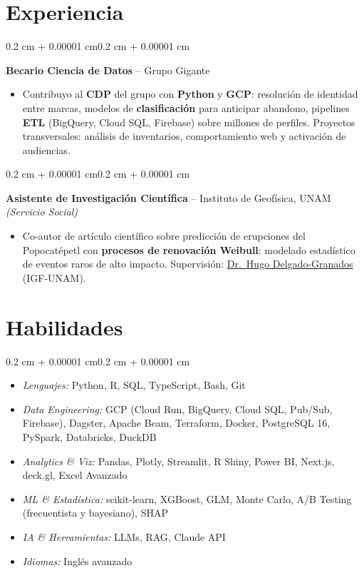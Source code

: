 \documentclass[10pt, letterpaper]{article}
\newenvironment{highlights}{
    \begin{itemize}[topsep=0 cm,parsep=0.02 cm,partopsep=0pt,itemsep=0pt,leftmargin=0.4 cm + 10pt]
}{\end{itemize}}
\newenvironment{highlightsforbulletentries}{
    \begin{itemize}[topsep=0.02 cm,parsep=0.02 cm,partopsep=0pt,itemsep=0pt,leftmargin=10pt]
}{\end{itemize}}
\newenvironment{onecolentry}{
    \begin{adjustwidth}{0.2 cm + 0.00001 cm}{0.2 cm + 0.00001 cm}
}{\end{adjustwidth}}
\let\hrefWithoutArrow\href
\renewcommand{\href}[2]{\hrefWithoutArrow{#1}{\ifthenelse{\equal{#2}{}}{ }{#2 }\raisebox{.15ex}{\footnotesize \faExternalLink*}}}
\begin{document}
    \section{Experiencia}
        \begin{onecolentry}
            \textbf{Becario Ciencia de Datos} -- Grupo Gigante
            \begin{highlights}
                \item Contribuyo al \textbf{CDP} del grupo con \textbf{Python} y \textbf{GCP}: resolución de identidad entre marcas, modelos de \textbf{clasificación} para anticipar abandono, pipelines \textbf{ETL} (BigQuery, Cloud SQL, Firebase) sobre millones de perfiles. Proyectos transversales: análisis de inventarios, comportamiento web y activación de audiencias.
            \end{highlights}
            \end{onecolentry}

        \vspace{0.02 cm}

        \begin{onecolentry}
            \textbf{Asistente de Investigación Científica} -- Instituto de Geofísica, UNAM \textit{(Servicio Social)}
            \begin{highlights}
                \item Co-autor de artículo científico sobre predicción de erupciones del Popocatépetl con \textbf{procesos de renovación Weibull}: modelado estadístico de eventos raros de alto impacto. Supervisión: \hrefWithoutArrow{https://scholar.google.com/citations?user=lDD0DZQAAAAJ}{Dr.\ Hugo Delgado-Granados} (IGF-UNAM).
            \end{highlights}
            \end{onecolentry}

    \section{Habilidades}
\begin{onecolentry}
    \begin{highlightsforbulletentries}
        \item \textit{Lenguajes:} Python, R, SQL, TypeScript, Bash, Git
        \item \textit{Data Engineering:} GCP (Cloud Run, BigQuery, Cloud SQL, Pub/Sub, Firebase), Dagster, Apache Beam, Terraform, Docker, PostgreSQL 16, PySpark, Databricks, DuckDB
        \item \textit{Analytics \& Viz:} Pandas, Plotly, Streamlit, R Shiny, Power BI, Next.js, deck.gl, Excel Avanzado
        \item \textit{ML \& Estadística:} scikit-learn, XGBoost, GLM, Monte Carlo, A/B Testing (frecuentista y bayesiano), SHAP
        \item \textit{IA \& Herramientas:} LLMs, RAG, Claude API
        \item \textit{Idiomas:} Inglés avanzado
    \end{highlightsforbulletentries}
\end{onecolentry}
\end{document}
